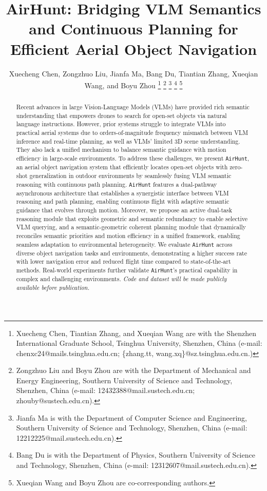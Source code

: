 \documentclass[lettersize,journal]{IEEEtran}
\title{\fontsize{23pt}{27pt}\selectfont 
AirHunt: Bridging VLM Semantics and Continuous Planning for Efficient Aerial Object Navigation
}
\author{Xuecheng Chen, Zongzhuo Liu, Jianfa Ma, Bang Du, Tiantian Zhang, Xueqian Wang, and Boyu Zhou%
\thanks{Xuecheng Chen, Tiantian Zhang, and Xueqian Wang are with the Shenzhen International Graduate School, Tsinghua University, Shenzhen, China (e-mail: chenxc24@mails.tsinghua.edu.cn; \{zhang.tt, wang.xq\}@sz.tsinghua.edu.cn.)}
\thanks{Zongzhuo Liu and Boyu Zhou are with the Department of Mechanical and Energy Engineering, Southern University of Science and Technology, Shenzhen, China (e-mail: 12432388@mail.sustech.edu.cn; zhouby@sustech.edu.cn).}%
\thanks{Jianfa Ma is with the Department of Computer Science and Engineering, Southern University of Science and Technology, Shenzhen, China (e-mail: 12212225@mail.sustech.edu.cn).}%
\thanks{Bang Du is with the Department of Physics, Southern University of Science and Technology, Shenzhen, China (e-mail: 12312607@mail.sustech.edu.cn).}%
\thanks{Xueqian Wang and Boyu Zhou are co-corresponding authors.}%
}
\def\sysname{\texttt{AirHunt}\xspace}
\begin{document}
\maketitle



\begin{abstract}
Recent advances in large Vision-Language Models (VLMs) have provided rich semantic understanding that empowers drones to search for open-set objects via natural language instructions.
However, prior systems struggle to integrate VLMs into practical aerial systems due to orders-of-magnitude frequency mismatch between VLM inference and real-time planning, as well as VLMs’ limited 3D scene understanding. They also lack a unified mechanism to balance semantic guidance with motion efficiency in large-scale environments.
To address these challenges, we present \sysname, an aerial object navigation system that efficiently locates open-set objects with zero-shot generalization in outdoor environments by seamlessly fusing VLM semantic reasoning with continuous path planning.
\sysname features a dual-pathway asynchronous architecture that establishes a synergistic interface between VLM reasoning and path planning, enabling continuous flight with adaptive semantic guidance that evolves through motion.
Moreover, we propose an active dual-task reasoning module that exploits geometric and semantic redundancy to enable selective VLM querying, and a semantic-geometric coherent planning module that dynamically reconciles semantic priorities and motion efficiency in a unified framework, enabling seamless adaptation to environmental heterogeneity.
We evaluate \sysname across diverse object navigation tasks and environments, demonstrating a higher success rate with lower navigation error and reduced flight time compared to state-of-the-art methods. Real-world experiments further validate \sysname's practical capability in complex and challenging environments. \textit{Code and dataset will be made publicly available before publication.}
\end{abstract}
\end{document}
